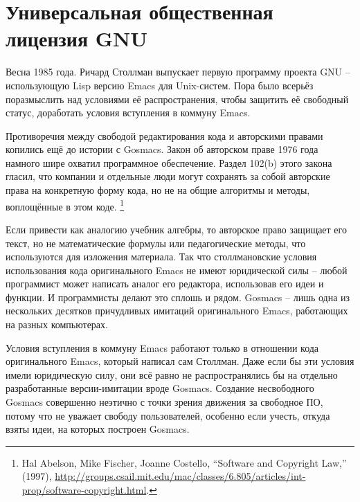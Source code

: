 

\chapter{Универсальная общественная лицензия GNU}

Весна 1985 года. Ричард Столлман выпускает первую программу проекта GNU -- использующую Lisp версию Emacs для Unix-систем. Пора было всерьёз поразмыслить над условиями её распространения, чтобы защитить её свободный статус, доработать условия вступления в коммуну Emacs.

Противоречия между свободой редактирования кода и авторскими правами копились ещё до истории с Gosmacs. Закон об авторском праве 1976 года намного шире охватил программное обеспечение. Раздел 102(b) этого закона гласил, что компании и отдельные люди могут сохранять за собой авторские права на конкретную форму кода, но не на общие алгоритмы и методы, воплощённые в этом коде. \footnote{Hal Abelson, Mike Fischer, Joanne Costello, \enquote{Software and Copyright Law,} (1997), \url{http://groups.csail.mit.edu/mac/classes/6.805/articles/int-prop/software-copyright.html}.}

Если привести как аналогию учебник алгебры, то авторское право защищает его текст, но не математические формулы или педагогические методы, что используются для изложения материала. Так что столлмановские условия использования кода оригинального Emacs не имеют юридической силы -- любой программист может написать аналог его редактора, использовав его идеи и функции. И программисты делают это сплошь и рядом. Gosmacs -- лишь одна из нескольких десятков причудливых имитаций оригинального Emacs, работающих на разных компьютерах.

Условия вступления в коммуну Emacs работают только в отношении кода оригинального Emacs, который написал сам Столлман. Даже если бы эти условия имели юридическую силу, они всё равно не распространялись бы на отдельно разработанные версии-имитации вроде Gosmacs. Создание несвободного Gosmacs совершенно неэтично с точки зрения движения за свободное ПО, потому что не уважает свободу пользователей, особенно если учесть, откуда взяты идеи, на которых построен Gosmacs.

